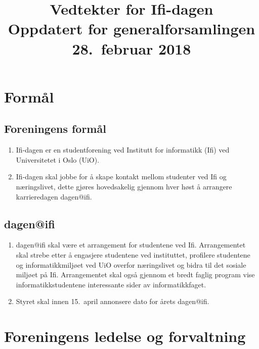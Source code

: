 \documentclass[norsk,a4paper]{article}
\author{}%
\title{\textbf{Vedtekter for Ifi-dagen} \\
{\large Oppdatert for generalforsamlingen 28.\ februar 2018}}
\date{}%
\begin{document}
\maketitle{}
\thispagestyle{fancy}

\section{Formål}
\subsection{Foreningens formål}
\begin{enumerate}
	\item{Ifi-dagen er en studentforening ved Institutt for informatikk (Ifi) ved Universitetet i Oslo (UiO).}
	\item{Ifi-dagen skal jobbe for å skape kontakt mellom studenter ved Ifi og næringslivet, dette gjøres hovedsakelig gjennom hver høst å arrangere karrieredagen dagen@ifi.}
\end{enumerate}
\subsection{dagen@ifi}
\begin{enumerate}
	\item{dagen@ifi skal være et arrangement for studentene ved Ifi. Arrangementet skal strebe etter å engasjere studentene ved instituttet, profilere studentene og informatikkmiljøet ved UiO overfor næringslivet og bidra til det sosiale miljøet på Ifi. Arrangementet skal også gjennom et bredt faglig program vise informatikkstudentene interessante sider av informatikkfaget.}
	\item{Styret skal innen 15.\ april annonsere dato for årets dagen@ifi.}
\end{enumerate}

\section{Foreningens ledelse og forvaltning}
\end{document}
